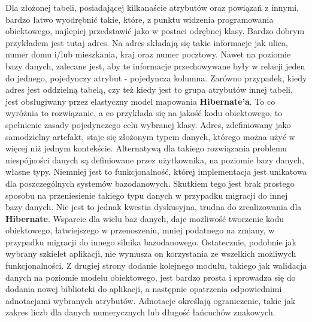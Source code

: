 	Dla złożonej tabeli, posiadającej kilkanaście atrybutów oraz powiązań z innymi, bardzo łatwo wyodrębnić takie, które, z punktu widzenia programowania obiektowego, najlepiej przedstawić jako w postaci odrębnej klasy. Bardzo dobrym przykładem jest tutaj adres. Na adres składają się takie informacje jak ulica, numer domu i/lub mieszkania, kraj oraz numer pocztowy. Nawet na poziomie bazy danych, zalecane jest, aby te informacje przechowywane były w relacji jeden do jednego, pojedynczy atrybut - pojedyncza kolumna. Zarówno przypadek, kiedy adres jest oddzielną tabelą, czy też kiedy jest to grupa atrybutów innej tabeli, jest obsługiwany przez elastyczny model mapowania \textbf{Hibernate'a}. To co wyróżnia to rozwiązanie, a co przykłada się na jakość kodu obiektowego, to spełnienie zasady pojedynczego celu wybranej klasy. Adres, zdefiniowany jako samodzielny artefakt, staje się złożonym typem danych, którego można użyć w więcej niż jednym kontekście.
	Alternatywą dla takiego rozwiązania problemu niespójności danych są definiowane przez użytkownika, na poziomie bazy danych, własne typy. Niemniej jest to funkcjonalność, której implementacja jest unikatowa dla poszczególnych systemów bazodanowych. Skutkiem tego jest brak prostego sposobu na przeniesienie takiego typu danych w przypadku migracji do innej bazy danych. Nie jest to jednak kwestia dyskusyjna, trudna do zrealizowania dla \textbf{Hibernate}. Wsparcie dla wielu baz danych, daje możliwość tworzenie kodu obiektowego, łatwiejszego w przenoszeniu, mniej podatnego na zmiany, w przypadku migracji do innego silnika bazodanowego. Ostatecznie, podobnie jak wybrany szkielet aplikacji, nie wymusza on korzystania ze wszelkich możliwych funkcjonalności. Z drugiej strony dodanie kolejnego modułu, takiego jak walidacja danych na poziomie modelu obiektowego, jest bardzo prosta i sprowadza się do dodania nowej biblioteki do aplikacji, a następnie opatrzenia odpowiednimi adnotacjami wybranych atrybutów. Adnotacje określają ograniczenie, takie jak zakres liczb dla danych numerycznych lub długość łańcuchów znakowych. 
	
